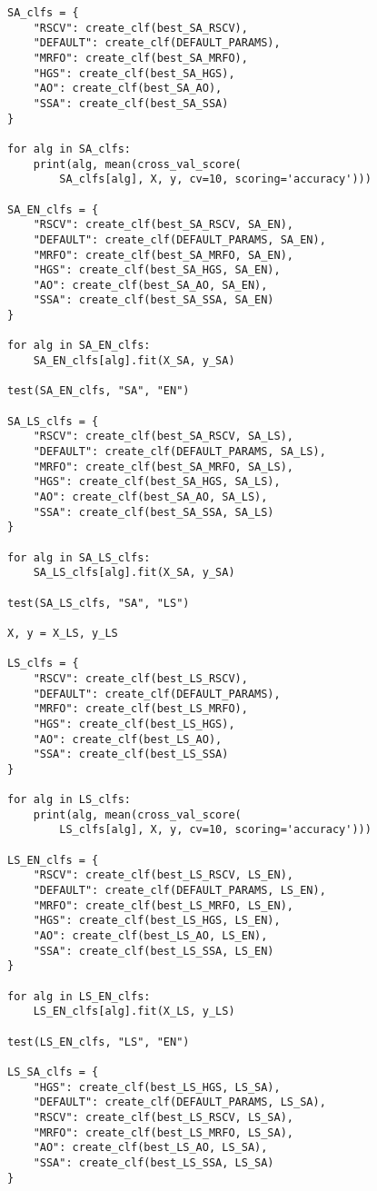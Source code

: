 \begin{lstlisting}
SA_clfs = {
    "RSCV": create_clf(best_SA_RSCV),
    "DEFAULT": create_clf(DEFAULT_PARAMS),
    "MRFO": create_clf(best_SA_MRFO),
    "HGS": create_clf(best_SA_HGS),
    "AO": create_clf(best_SA_AO),
    "SSA": create_clf(best_SA_SSA)
}

for alg in SA_clfs:
    print(alg, mean(cross_val_score(
        SA_clfs[alg], X, y, cv=10, scoring='accuracy')))

SA_EN_clfs = {
    "RSCV": create_clf(best_SA_RSCV, SA_EN),
    "DEFAULT": create_clf(DEFAULT_PARAMS, SA_EN),
    "MRFO": create_clf(best_SA_MRFO, SA_EN),
    "HGS": create_clf(best_SA_HGS, SA_EN),
    "AO": create_clf(best_SA_AO, SA_EN),
    "SSA": create_clf(best_SA_SSA, SA_EN)
}

for alg in SA_EN_clfs:
    SA_EN_clfs[alg].fit(X_SA, y_SA)

test(SA_EN_clfs, "SA", "EN")

SA_LS_clfs = {
    "RSCV": create_clf(best_SA_RSCV, SA_LS),
    "DEFAULT": create_clf(DEFAULT_PARAMS, SA_LS),
    "MRFO": create_clf(best_SA_MRFO, SA_LS),
    "HGS": create_clf(best_SA_HGS, SA_LS),
    "AO": create_clf(best_SA_AO, SA_LS),
    "SSA": create_clf(best_SA_SSA, SA_LS)
}

for alg in SA_LS_clfs:
    SA_LS_clfs[alg].fit(X_SA, y_SA)

test(SA_LS_clfs, "SA", "LS")

X, y = X_LS, y_LS

LS_clfs = {
    "RSCV": create_clf(best_LS_RSCV),
    "DEFAULT": create_clf(DEFAULT_PARAMS),
    "MRFO": create_clf(best_LS_MRFO),
    "HGS": create_clf(best_LS_HGS),
    "AO": create_clf(best_LS_AO),
    "SSA": create_clf(best_LS_SSA)
}

for alg in LS_clfs:
    print(alg, mean(cross_val_score(
        LS_clfs[alg], X, y, cv=10, scoring='accuracy')))

LS_EN_clfs = {
    "RSCV": create_clf(best_LS_RSCV, LS_EN),
    "DEFAULT": create_clf(DEFAULT_PARAMS, LS_EN),
    "MRFO": create_clf(best_LS_MRFO, LS_EN),
    "HGS": create_clf(best_LS_HGS, LS_EN),
    "AO": create_clf(best_LS_AO, LS_EN),
    "SSA": create_clf(best_LS_SSA, LS_EN)
}

for alg in LS_EN_clfs:
    LS_EN_clfs[alg].fit(X_LS, y_LS)

test(LS_EN_clfs, "LS", "EN")

LS_SA_clfs = {
    "HGS": create_clf(best_LS_HGS, LS_SA),
    "DEFAULT": create_clf(DEFAULT_PARAMS, LS_SA),
    "RSCV": create_clf(best_LS_RSCV, LS_SA),
    "MRFO": create_clf(best_LS_MRFO, LS_SA),
    "AO": create_clf(best_LS_AO, LS_SA),
    "SSA": create_clf(best_LS_SSA, LS_SA)
}


\end{lstlisting}
